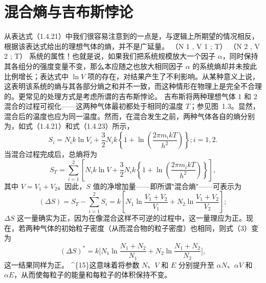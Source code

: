 \section{混合熵与吉布斯悖论}\label{ux6df7ux5408ux71b5ux4e0eux5409ux5e03ux65afux6096ux8bba}
从表达式（1.4.21）中我们很容易注意到的一点是，与逻辑上所期望的情况相反，根据该表达式给出的理想气体的熵，并不是广延量。
（N 1 , V 1 ; T）
（N 2 , V 2 ; T）
系统的属性！也就是说，如果我们把系统规模放大一个因子 \(\alpha\)，同时保持其各组分的强度变量不变，那么本应随之也放大相同因子 \(\alpha\) 的系统熵却并未按此比例增长；表达式中 \(\ln V\) 项的存在，对结果产生了不利影响。从某种意义上说，这表明该系统的熵与其各部分熵之和并不一致，而这种情形在物理上是完全不合理的。更常见的处理方式是考虑所谓的吉布斯悖论。
吉布斯将两种理想气体 1 和 2 混合的过程可视化——这两种气体最初都处于相同的温度 \(T\)；参见图~1.3。显然，混合后的温度也应为同一温度。然而，在混合发生之前，两种气体各自的熵分别为，如式（1.4.21）和式（1.4.23）所示，
\begin{equation}\tag{1.3.52}\label{eq:1.3.52}
S _ { i } = N _ { i } k \ln V _ { i } + \frac { 3 } { 2 } N _ { i } k \left\{ 1 + \ln \left( \frac { 2 \pi m _ { i } k T } { h ^{2} } \right) \right\} ;  i = 1 , 2 .
\end{equation}
当混合过程完成后，总熵将为
\begin{equation}\tag{1.3.53}\label{eq:1.3.53}
S _ { T } = \sum _ { i = 1 } ^{2} \left[ N _ { i } k \ln V + \frac { 3 } { 2 } N _ { i } k \left\{ 1 + \ln \left( \frac { 2 \pi m _ { i } k T } { h ^{2} } \right) \right\} \right] ,
\end{equation}
其中 \(V = V_1 + V_2\)。因此，\(S\) 值的净增加量——即所谓"混合熵"——可表示为
\begin{equation}\tag{1.3.54}\label{eq:1.3.54}
( \Delta S ) = S _ { T } - \sum _ { i = 1 } ^{2} S _ { i } = k \left[ N _ { 1 } \ln { \frac { V _ { 1 } + V _ { 2 } } { V _ { 1 } } } + N _ { 2 } \ln { \frac { V _ { 1 } + V _ { 2 } } { V _ { 2 } } } \right] ;
\end{equation}
\(\Delta S\) 这一量确实为正，因为在像混合这样不可逆的过程中，这一量理应为正。现在，若两种气体的初始粒子密度（从而混合物的粒子密度）也相同，则式（3）变为
\begin{equation}\tag{1.3.55}\label{eq:1.3.55}
( \Delta S ) ^{*} = k \Bigg [ N _ { 1 } \ln \frac { N _ { 1 } + N _ { 2 } } { N _ { 1 } } + N _ { 2 } \ln \frac { N _ { 1 } + N _ { 2 } } { N _ { 2 } } \Bigg ] ,
\end{equation}
这一结果同样为正。
\^{}\{15\}这意味着将参数 \(N\)、\(V\) 和 \(E\) 分别提升至 \(\alpha N\)、\(\alpha V\) 和 \(\alpha E\)，从而使每粒子的能量和每粒子的体积保持不变。
